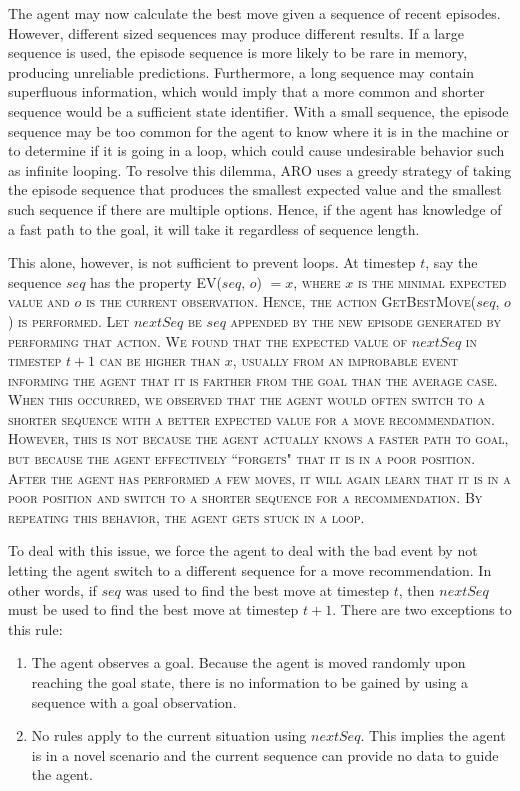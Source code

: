\documentclass[letterpaper]{article} %
\begin{document}
The agent may now calculate the best move given a sequence of recent
episodes. However, different sized sequences may produce different
results. If a large sequence is used, the episode sequence is more
likely to be rare in memory, producing unreliable
predictions. Furthermore, a long sequence may contain superfluous
information, which would imply that a more common and shorter sequence
would be a sufficient state identifier. With a small sequence, the
episode sequence may be too common for the agent to know where it is
in the machine or to determine if it is going in a loop, which could
cause undesirable behavior such as infinite looping. To resolve this
dilemma, ARO uses a greedy strategy of taking the episode sequence
that produces the smallest expected value and the smallest such sequence
if there are multiple options. Hence, if the agent has
knowledge of a fast path to the goal, it will take it regardless of
sequence length.

This alone, however, is not sufficient to prevent loops. At timestep
$t$, say the sequence $seq$ has the property \scshape
EV\normalfont($seq$, $o$) $ = x$, where $x$ is the minimal expected
value and $o$ is the current observation. Hence, the action \scshape GetBestMove\normalfont($seq$, $o$) is
performed. Let $nextSeq$ be $seq$ appended by the new episode
generated by performing that action. We found that the expected value
of $nextSeq$ in timestep $t+ 1$ can be higher than $x$, usually from
an improbable event informing the agent that it is farther from the
goal than the average case. When this occurred, we observed that the
agent would often switch to a shorter sequence with a better expected
value for a move recommendation. However, this is not because the
agent actually knows a faster path to goal, but because the agent
effectively ``forgets" that it is in a poor position. After the agent
has performed a few moves, it will again learn that it is in a poor
position and switch to a shorter sequence for a recommendation. By
repeating this behavior, the agent gets stuck in a loop.

To deal with this issue, we force the agent to deal with the bad event
by not letting the agent switch to a different sequence for a move
recommendation. In other words, if $seq$ was used to find the best
move at timestep $t$, then $nextSeq$ must be used to find the best
move at timestep $t+1$. There are two exceptions to this rule:
\begin{enumerate}
	\item The agent observes a goal. Because the agent is moved randomly upon reaching the goal state, there is no information to be gained by using a sequence with a goal observation.
	\item No rules apply to the current situation using $nextSeq$. This implies the agent is in a novel scenario and the current sequence can provide no data to guide the agent.
\end{enumerate}
\end{document}
